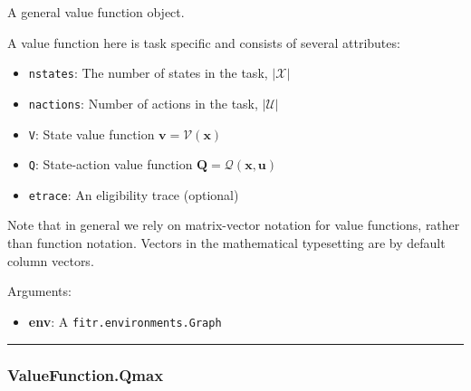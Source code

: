 \begin{Shaded}
\begin{Highlighting}[]
\end{Highlighting}
\end{Shaded}

A general value function object.

A value function here is task specific and consists of several
attributes:

\begin{itemize}
\tightlist
\item
  \texttt{nstates}: The number of states in the task, \(|\mathcal X|\)
\item
  \texttt{nactions}: Number of actions in the task, \(|\mathcal U|\)
\item
  \texttt{V}: State value function \(\mathbf v = \mathcal V(\mathbf x)\)
\item
  \texttt{Q}: State-action value function
  \(\mathbf Q = \mathcal Q(\mathbf x, \mathbf u)\)
\item
  \texttt{etrace}: An eligibility trace (optional)
\end{itemize}

Note that in general we rely on matrix-vector notation for value
functions, rather than function notation. Vectors in the mathematical
typesetting are by default column vectors.

Arguments:

\begin{itemize}
\tightlist
\item
  \textbf{env}: A \texttt{fitr.environments.Graph}
\end{itemize}

\begin{center}\rule{0.5\linewidth}{\linethickness}\end{center}

\hypertarget{valuefunction.qmax}{%
\subsubsection{ValueFunction.Qmax}\label{valuefunction.qmax}}

\begin{Shaded}
\begin{Highlighting}[]
\end{Highlighting}
\end{Shaded}

